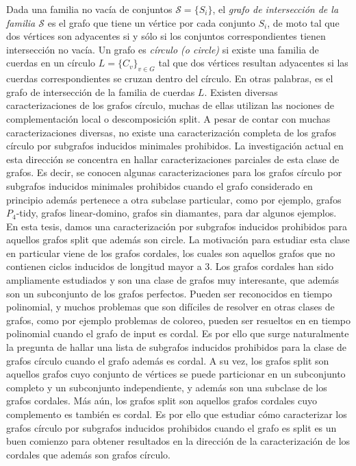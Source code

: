 \documentclass[12pt]{book}
\theoremstyle{plain}
\theoremstyle{remark}
\begin{document}
Dada una familia no vacía de conjuntos $\mathcal{S} = \{S_i\}$, el \emph{grafo de intersección de la familia $\mathcal{S}$} es el grafo que tiene un vértice por cada conjunto $S_i$, de moto tal que dos vértices son adyacentes si y sólo si los conjuntos correspondientes tienen intersección no vacía. Un grafo es \emph{círculo (o circle)} si existe una familia de cuerdas en un círculo $L= \{ C_v \}_{v\in G}$ tal que dos vértices resultan adyacentes si las cuerdas correspondientes se cruzan dentro del círculo. En otras palabras, es el grafo de intersección de la familia de cuerdas $L$.
Existen diversas caracterizaciones de los grafos círculo, muchas de ellas utilizan las nociones de complementación local o descomposición split. A pesar de contar con muchas caracterizaciones diversas, no existe una caracterización completa de los grafos círculo por subgrafos inducidos minimales prohibidos.
La investigación actual en esta dirección se concentra en hallar caracterizaciones parciales de esta clase de grafos. Es decir, se conocen algunas caracterizaciones para los grafos círculo por subgrafos in\-du\-ci\-dos minimales prohibidos cuando el grafo considerado en principio además pertenece a otra subclase particular, como por ejemplo, grafos $P_4$-tidy, grafos linear-domino, grafos sin diamantes, para dar algunos ejemplos. 
En esta tesis, damos una caracterización por subgrafos inducidos prohibidos para aquellos grafos split que además son circle. 
La motivación para estudiar esta clase en particular viene de los grafos cordales, los cuales son aquellos grafos que no contienen ciclos inducidos de longitud mayor a $3$. Los grafos cordales han sido ampliamente estudiados y son una clase de grafos muy interesante, que además son un subconjunto de los grafos perfectos. Pueden ser reconocidos en tiempo polinomial, y muchos problemas que son difíciles de resolver en otras clases de grafos, como por ejemplo problemas de coloreo, pueden ser resueltos en en tiempo polinomial cuando el grafo de input es cordal. Es por ello que surge naturalmente la pregunta de hallar una lista de subgrafos inducidos prohibidos para la clase de grafos círculo cuando el grafo además es cordal. 
A su vez, los grafos split son aquellos grafos cuyo conjunto de vértices se puede particionar en un subconjunto completo y un subconjunto independiente, y además son una subclase de los grafos cordales. Más aún, los grafos split son aquellos grafos cordales cuyo complemento es también es cordal. Es por ello que estudiar cómo caracterizar los grafos círculo por subgrafos inducidos prohibidos cuando el grafo es split es un buen comienzo para obtener resultados en la dirección de la caracterización de los cordales que además son grafos círculo.
\end{document}
